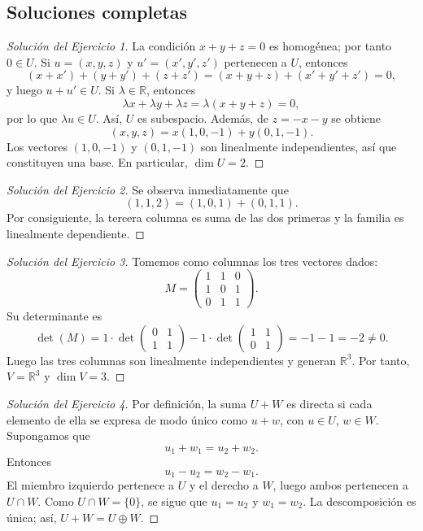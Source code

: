 \documentclass[10pt,a4paper,oneside]{article}
\theoremstyle{plain}
\theoremstyle{definition}
\theoremstyle{remark}
\newcommand{\R}{\mathbb{R}}
\begin{document}
\subsection{Soluciones completas}
\begin{proof}[Solución del Ejercicio 1]
La condición \(x+y+z=0\) es homogénea; por tanto \(0\in U\). Si \(u=(x,y,z)\) y \(u'=(x',y',z')\) pertenecen a \(U\), entonces
\[(x+x')+(y+y')+(z+z')=(x+y+z)+(x'+y'+z')=0,
\]
y luego \(u+u'\in U\). Si \(\lambda\in\R\), entonces
\[\lambda x+\lambda y+\lambda z=\lambda(x+y+z)=0,
\]
por lo que \(\lambda u\in U\). Así, \(U\) es subespacio. Además, de \(z=-x-y\) se obtiene
\[(x,y,z)=x(1,0,-1)+y(0,1,-1).
\]
Los vectores \((1,0,-1)\) y \((0,1,-1)\) son linealmente independientes, así que constituyen una base. En particular, \(\dim U=2\).
\end{proof}
\begin{proof}[Solución del Ejercicio 2]
Se observa inmediatamente que
\[(1,1,2)=(1,0,1)+(0,1,1).
\]
Por consiguiente, la tercera columna es suma de las dos primeras y la familia es linealmente dependiente.
\end{proof}
\begin{proof}[Solución del Ejercicio 3]
Tomemos como columnas los tres vectores dados:
\[
M=\begin{pmatrix}1&1&0\\1&0&1\\0&1&1\end{pmatrix}.
\]
Su determinante es
\[
\det(M)=1\cdot\det\begin{pmatrix}0&1\\1&1\end{pmatrix}-1\cdot\det\begin{pmatrix}1&1\\0&1\end{pmatrix}=-1-1=-2\neq0.
\]
Luego las tres columnas son linealmente independientes y generan \(\R^3\). Por tanto, \(V=\R^3\) y \(\dim V=3\).
\end{proof}
\begin{proof}[Solución del Ejercicio 4]
Por definición, la suma \(U+W\) es directa si cada elemento de ella se expresa de modo único como \(u+w\), con \(u\in U\), \(w\in W\). Supongamos que
\[u_1+w_1=u_2+w_2.
\]
Entonces
\[u_1-u_2=w_2-w_1.
\]
El miembro izquierdo pertenece a \(U\) y el derecho a \(W\), luego ambos pertenecen a \(U\cap W\). Como \(U\cap W=\{0\}\), se sigue que \(u_1=u_2\) y \(w_1=w_2\). La descomposición es única; así, \(U+W=U\oplus W\).
\end{proof}
\end{document}
